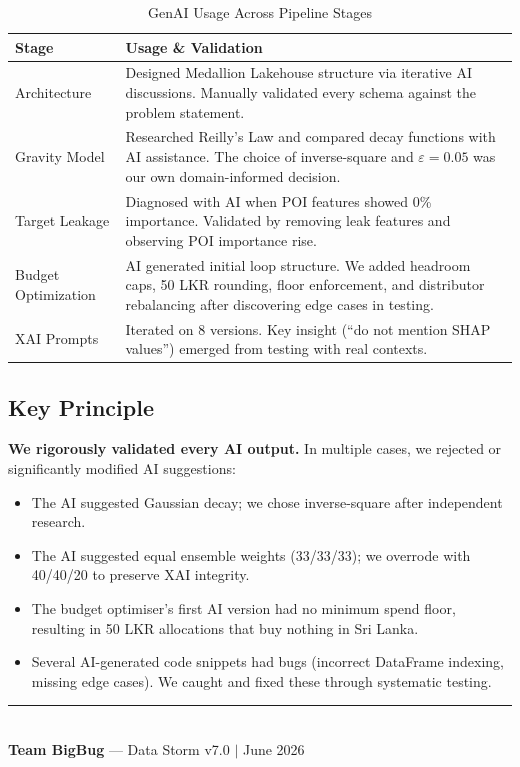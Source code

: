 \documentclass[10.75pt, a4paper]{article}
\begin{document}
\begin{table}[H]
\centering
\caption{GenAI Usage Across Pipeline Stages}
\begin{tabularx}{\textwidth}{lX}
\toprule
\textbf{Stage} & \textbf{Usage \& Validation} \\
\midrule
Architecture & Designed Medallion Lakehouse structure via iterative AI discussions. Manually validated every schema against the problem statement. \\
Gravity Model & Researched Reilly's Law and compared decay functions with AI assistance. The choice of inverse-square and $\varepsilon = 0.05$ was our own domain-informed decision. \\
Target Leakage & Diagnosed with AI when POI features showed 0\% importance. Validated by removing leak features and observing POI importance rise. \\
Budget Optimization & AI generated initial loop structure. We added headroom caps, 50 LKR rounding, floor enforcement, and distributor rebalancing after discovering edge cases in testing. \\
XAI Prompts & Iterated on 8 versions. Key insight (``do not mention SHAP values'') emerged from testing with real contexts. \\
\bottomrule
\end{tabularx}
\end{table}

\subsection{Key Principle}

\textbf{We rigorously validated every AI output.} In multiple cases, we rejected or significantly modified AI suggestions:

\begin{itemize}
    \item The AI suggested Gaussian decay; we chose inverse-square after independent research.
    \item The AI suggested equal ensemble weights (33/33/33); we overrode with 40/40/20 to preserve XAI integrity.
    \item The budget optimiser's first AI version had no minimum spend floor, resulting in 50 LKR allocations that buy nothing in Sri Lanka.
    \item Several AI-generated code snippets had bugs (incorrect DataFrame indexing, missing edge cases). We caught and fixed these through systematic testing.
\end{itemize}

\vfill
\begin{center}
\rule{0.5\textwidth}{0.4pt}\\[0.5em]
{\large\textbf{Team BigBug} --- Data Storm v7.0 $\mid$ June 2026}
\end{center}
\end{document}

